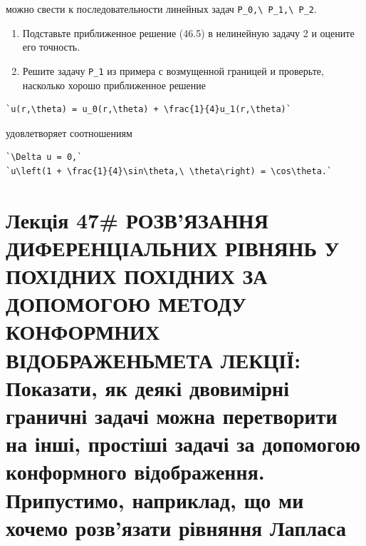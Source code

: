 \documentclass[
  ukrainian,
]{article}
\begin{document}
можно свести к последовательности линейных задач
\texttt{P\_0,\textbackslash{}\ P\_1,\textbackslash{}\ P\_2}.

\begin{enumerate}
\def\labelenumi{\arabic{enumi}.}
\setcounter{enumi}{2}
\item
  Подставьте приближенное решение (46.5) в нелинейную задачу 2 и оцените
  его точность.
\item
  Решите задачу \texttt{P\_1} из примера с возмущенной границей и
  проверьте, насколько хорошо приближенное решение
\end{enumerate}

\begin{verbatim}
`u(r,\theta) = u_0(r,\theta) + \frac{1}{4}u_1(r,\theta)`
\end{verbatim}

удовлетворяет соотношениям

\begin{verbatim}
`\Delta u = 0,`
`u\left(1 + \frac{1}{4}\sin\theta,\ \theta\right) = \cos\theta.`
\end{verbatim}

\section{Лекція 47\# РОЗВ'ЯЗАННЯ ДИФЕРЕНЦІАЛЬНИХ РІВНЯНЬ У ПОХІДНИХ
ПОХІДНИХ ЗА ДОПОМОГОЮ МЕТОДУ КОНФОРМНИХ ВІДОБРАЖЕНЬМЕТА ЛЕКЦІЇ:
Показати, як деякі двовимірні граничні задачі можна перетворити на інші,
простіші задачі за допомогою конформного відображення. Припустимо,
наприклад, що ми хочемо розв'язати рівняння
Лапласа}\label{ux43bux435ux43aux446ux456ux44f-47-ux440ux43eux437ux432ux44fux437ux430ux43dux43dux44f-ux434ux438ux444ux435ux440ux435ux43dux446ux456ux430ux43bux44cux43dux438ux445-ux440ux456ux432ux43dux44fux43dux44c-ux443-ux43fux43eux445ux456ux434ux43dux438ux445-ux43fux43eux445ux456ux434ux43dux438ux445-ux437ux430-ux434ux43eux43fux43eux43cux43eux433ux43eux44e-ux43cux435ux442ux43eux434ux443-ux43aux43eux43dux444ux43eux440ux43cux43dux438ux445-ux432ux456ux434ux43eux431ux440ux430ux436ux435ux43dux44cux43cux435ux442ux430-ux43bux435ux43aux446ux456ux457-ux43fux43eux43aux430ux437ux430ux442ux438-ux44fux43a-ux434ux435ux44fux43aux456-ux434ux432ux43eux432ux438ux43cux456ux440ux43dux456-ux433ux440ux430ux43dux438ux447ux43dux456-ux437ux430ux434ux430ux447ux456-ux43cux43eux436ux43dux430-ux43fux435ux440ux435ux442ux432ux43eux440ux438ux442ux438-ux43dux430-ux456ux43dux448ux456-ux43fux440ux43eux441ux442ux456ux448ux456-ux437ux430ux434ux430ux447ux456-ux437ux430-ux434ux43eux43fux43eux43cux43eux433ux43eux44e-ux43aux43eux43dux444ux43eux440ux43cux43dux43eux433ux43e-ux432ux456ux434ux43eux431ux440ux430ux436ux435ux43dux43dux44f.-ux43fux440ux438ux43fux443ux441ux442ux438ux43cux43e-ux43dux430ux43fux440ux438ux43aux43bux430ux434-ux449ux43e-ux43cux438-ux445ux43eux447ux435ux43cux43e-ux440ux43eux437ux432ux44fux437ux430ux442ux438-ux440ux456ux432ux43dux44fux43dux43dux44f-ux43bux430ux43fux43bux430ux441ux430}
\end{document}
